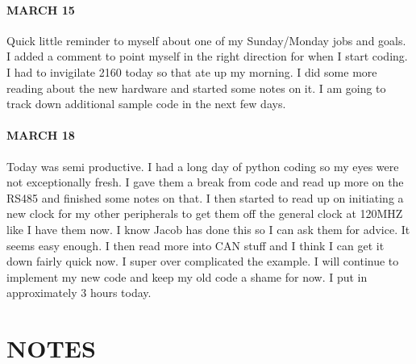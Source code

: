 \documentclass{article}
\begin{document}
\paragraph{MARCH 15} Quick little reminder to myself about one of my Sunday/Monday jobs and goals. I added a comment to point myself in the right direction for when I start coding. I had to invigilate 2160 today so that ate up my morning. I did some more reading about the new hardware and started some notes on it. I am going to track down additional sample code in the next few days.
\paragraph{MARCH 18} Today was semi productive. I had a long day of python coding so my eyes were not exceptionally fresh. I gave them a break from code and read up more on the RS485 and finished some notes on that. I then started to read up on initiating a new clock for my other peripherals to get them off the general clock at 120MHZ like I have them now. I know Jacob has done this so I can ask them for advice. It seems easy enough. I then read more into CAN stuff and I think I can get it down fairly quick now. I super over complicated the example. I will continue to implement my new code and keep my old code a shame for now. I put in approximately 3 hours today. 
\section{NOTES}



\end{document}
